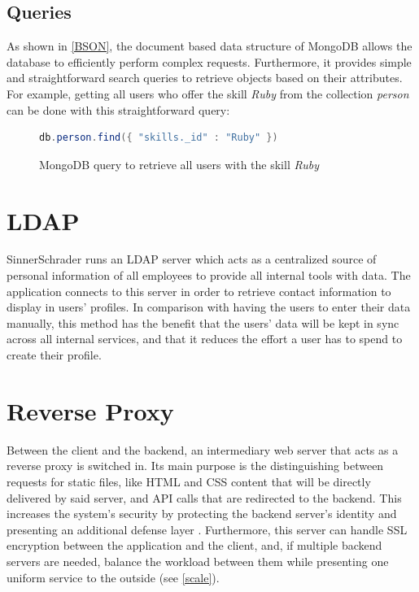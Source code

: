 \newpage

\subsection{Queries}
As shown in \ref{BSON}, the document based data structure of MongoDB allows the database to efficiently perform complex requests. Furthermore, it provides simple and straightforward search queries to retrieve objects based on their attributes. For example, getting all users who offer the skill \textit{Ruby} from the collection \textit{person} can be done with this straightforward query:
\begin{figure}[h]
\begin{lstlisting}[language=Java]
db.person.find({ "skills._id" : "Ruby" })
\end{lstlisting}
\caption[Code: Example Database Query]{MongoDB query to retrieve all users with the skill \textit{Ruby}}
\end{figure}

\section{LDAP}
SinnerSchrader runs an LDAP server which acts as a centralized source of personal information of all employees to provide all internal tools with data. The application connects to this server in order to retrieve contact information to display in users' profiles. In comparison with having the users to enter their data manually, this method has the benefit that the users' data will be kept in sync across all internal services, and that it reduces the effort a user has to spend to create their profile.

\section{Reverse Proxy}
Between the client and the backend, an intermediary web server that acts as a reverse proxy is switched in. Its main purpose is the distinguishing between requests for static files, like HTML and CSS content that will be directly delivered by said server, and API calls that are redirected to the backend. This increases the system's security by protecting the backend server's identity and presenting an additional defense layer \cite{NGINX}. Furthermore, this server can handle SSL encryption between the application and the client, and, if multiple backend servers are needed, balance the workload between them while presenting one uniform service to the outside (see \ref{scale}).

